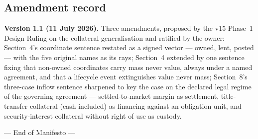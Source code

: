 \documentclass[11pt,a4paper]{article}
\begin{document}
\subsection*{Amendment record}

\textbf{Version 1.1 (11 July 2026).} Three amendments, proposed by the
v15 Phase~1 Design Ruling on the collateral generalisation and ratified
by the owner: Section~4's coordinate sentence restated as a signed
vector --- owned, lent, posted --- with the five original names as its
rays; Section~4 extended by one sentence fixing that non-owned
coordinates carry mass never value, always under a named agreement, and
that a lifecycle event extinguishes value never mass; Section~8's
three-case inflow sentence sharpened to key the case on the declared
legal regime of the governing agreement --- settled-to-market margin as
settlement, title-transfer collateral (cash included) as financing
against an obligation unit, and security-interest collateral without
right of use as custody.

--- End of Manifesto ---
\end{document}
